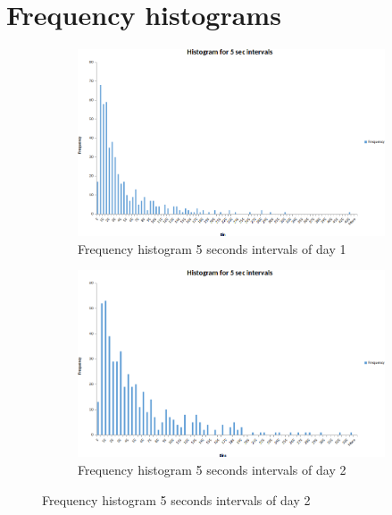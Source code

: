 \documentclass{article}
\begin{document}
\section{Frequency histograms}

\begin{figure}[H]
    \begin{subfigure}{0.5\textwidth}
        \includegraphics[width=\linewidth]{day1-hist-5sec.png}
        \caption{Frequency histogram 5 seconds intervals of day 1}
    \end{subfigure}
    \begin{subfigure} {0.5\textwidth}
        \includegraphics[width=\linewidth]{day2-hist-5sec.png}
        \caption{Frequency histogram 5 seconds intervals of day 2}
    \end{subfigure}
\end{figure}
\end{document}
